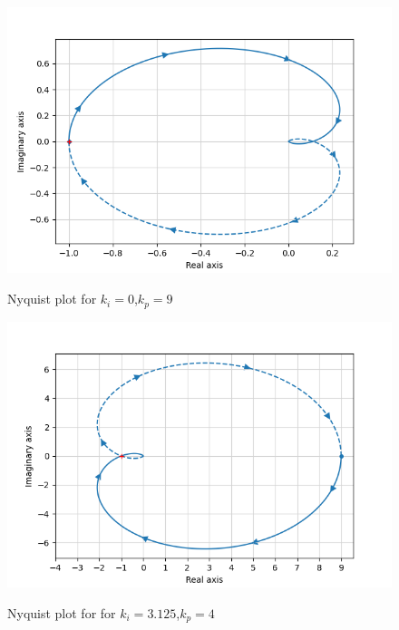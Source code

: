 \documentclass[journal,12pt,onecolumn]{IEEEtran}
\theoremstyle{remark}
\begin{document}
\begin{enumerate}
\begin{figure}[!ht]    
    \centering
\graphicspath{ {figs/} }
\includegraphics[width=\columnwidth]{plot_2}
\label{figure:ee25-gate4-nyquist2}
\caption{Nyquist plot for $k_i=0$,$k_p=9$}
\end{figure}

\begin{figure}[!ht]    
    \centering
\graphicspath{ {figs/} }
\includegraphics[width=\columnwidth]{plot_3}
\label{figure:ee25-gate4-nyquist3}
\caption{Nyquist plot for for $k_i=3.125$,$k_p=4$}
\end{figure}

     \end{enumerate}

  
   
    
\end{document}

